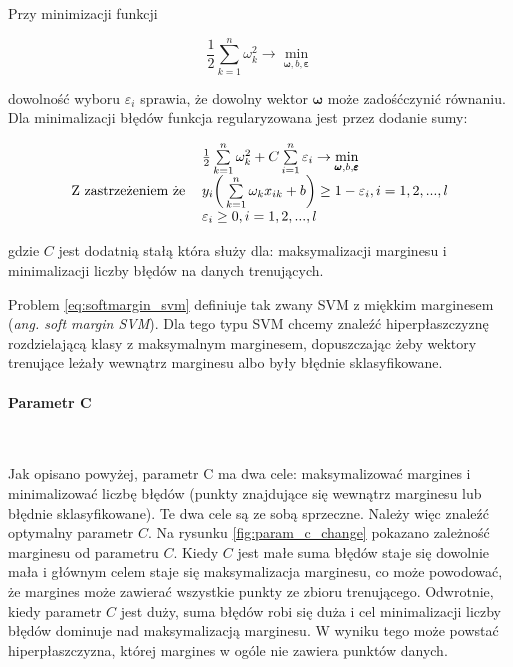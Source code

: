 \documentclass[paper=a4, fontsize=11pt]{scrartcl} %
\newcommand{\myparagraph}[1]{\paragraph{#1}\mbox{}\\}
\numberwithin{equation}{section} %
\numberwithin{figure}{section} %
\begin{document}
    \par Przy minimizacji funkcji

    \begin{equation}
        \frac{1}{2} \sum\limits_{k=1}^n \omega_{k}^2 \rightarrow \min\limits_{\pmb{\omega},b,
        \pmb{\varepsilon}}
    \end{equation}

    \par dowolność wyboru $\varepsilon_i$ sprawia, że dowolny wektor $\pmb{\omega}$ może
    zadośćczynić równaniu. Dla minimalizacji błędów funkcja regularyzowana jest przez dodanie sumy:

    \begin{equation} \label{eq:softmargin_svm}
        \begin{tabular}{rl}
            & $\frac{1}{2}\sum\limits_{k=1}^{n}\omega_k^2 + C\sum\limits_{i=1}^{n}\varepsilon_i
            \rightarrow \min\limits_{\pmb{\omega},b,\pmb{\varepsilon}}$ \\
            Z zastrzeżeniem że 
            & $y_i \bigg(\sum\limits_{k=1}^n \omega_k x_{ik} + b \bigg) \geq 1 - \varepsilon_i,
            i=1,2,...,l$ \\
            & $\varepsilon_i \geq 0, i=1,2,...,l$
        \end{tabular}
    \end{equation}

    gdzie $C$ jest dodatnią stałą która służy dla: maksymalizacji marginesu i minimalizacji
    liczby błędów na danych trenujących.
    \par Problem \ref{eq:softmargin_svm} definiuje tak zwany SVM z miękkim
    marginesem (\textit{ang. soft margin SVM}). Dla tego typu SVM chcemy znaleźć
    hiperpłaszczyznę rozdzielającą klasy z maksymalnym marginesem, dopuszczając żeby wektory
    trenujące leżały wewnątrz marginesu albo były błędnie sklasyfikowane.

\myparagraph{Parametr C}
    \par Jak opisano powyżej, parametr C ma dwa cele: maksymalizować margines i minimalizować
    liczbę błędów (punkty znajdujące się wewnątrz marginesu lub błędnie sklasyfikowane). Te dwa
    cele są ze sobą sprzeczne. Należy więc znaleźć optymalny parametr $C$. Na rysunku \ref{fig:param_c_change} pokazano zależność  marginesu od parametru $C$.
		Kiedy $C$ jest małe suma błędów staje się dowolnie mała i głównym celem staje się
    maksymalizacja marginesu, co może powodować, że margines może zawierać wszystkie punkty ze
    zbioru trenującego. Odwrotnie, kiedy parametr $C$ jest duży, suma błędów
    robi się duża i cel minimalizacji liczby błędów dominuje nad maksymalizacją marginesu. W
    wyniku tego może powstać hiperpłaszczyzna, której margines w ogóle nie zawiera punktów danych.
\end{document}
